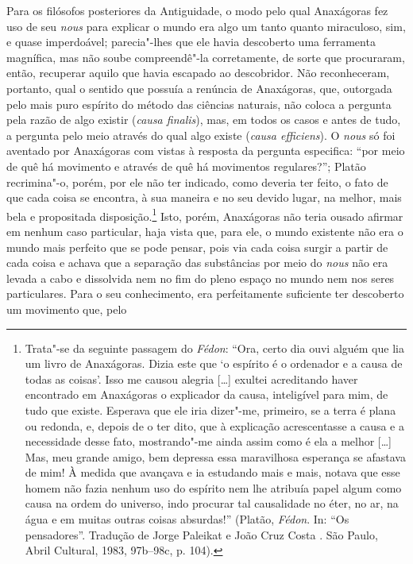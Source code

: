 Para os filósofos posteriores da Antiguidade, o modo pelo qual
Anaxágoras fez uso de seu \textit{nous} para explicar o mundo era algo
um tanto quanto miraculoso, sim, e quase imperdoável; parecia"-lhes que
ele havia descoberto uma ferramenta magnífica, mas não soube
compreendê"-la corretamente, de sorte que procuraram, então, recuperar
aquilo que havia escapado ao descobridor. Não reconheceram, portanto,
qual o sentido que possuía a renúncia de Anaxágoras, que, outorgada
pelo mais puro espírito do método das ciências naturais, não coloca a
pergunta pela razão de algo existir (\textit{causa finalis}), mas, em \label{causafinalis}
todos os casos e antes de tudo, a pergunta pelo meio através do qual
algo existe (\textit{causa efficiens}). O \textit{nous} só foi aventado
por Anaxágoras com vistas à resposta da pergunta especifica: ``por meio
de quê há movimento e através de quê há movimentos regulares?''; Platão
recrimina"-o, porém, por ele não ter indicado, como deveria ter feito, o
fato de que cada coisa se encontra, à sua maneira e no seu devido
lugar, na melhor, mais bela e propositada disposição.\footnote{ Trata"-se 
da seguinte passagem do \textit{Fédon}: ``Ora, certo dia ouvi
alguém que lia um livro de Anaxágoras. Dizia este que `o espírito é o
ordenador e a causa de todas as coisas'. Isso me causou alegria [\ldots]
exultei acreditando haver encontrado em Anaxágoras o explicador da
causa, inteligível para mim, de tudo que existe. Esperava que ele iria
dizer"-me, primeiro, se a terra é plana ou redonda, e, depois de o ter
dito, que à explicação acrescentasse a causa e a necessidade desse
fato, mostrando"-me ainda assim como é ela a melhor [\ldots] Mas, meu
grande amigo, bem depressa essa maravilhosa esperança se afastava de
mim! À medida que avançava e ia estudando mais e mais, notava que esse
homem não fazia nenhum uso do espírito nem lhe atribuía papel algum
como causa na ordem do universo, indo procurar tal causalidade no éter,
no ar, na água e em muitas outras coisas absurdas!'' (Platão,
\textit{Fédon}. In: ``Os pensadores''. Tradução de Jorge Paleikat e João
Cruz Costa . São Paulo, Abril Cultural, 1983, 97b--98c, p. 104).} 
Isto, porém, Anaxágoras não teria ousado afirmar em nenhum caso
particular, haja vista que, para ele, o mundo existente não era o mundo
mais perfeito que se pode pensar, pois via cada coisa surgir a partir
de cada coisa e achava que a separação das substâncias por meio do
\textit{nous} não era levada a cabo e dissolvida nem no fim do pleno
espaço no mundo nem nos seres particulares. Para o seu conhecimento,
era perfeitamente suficiente ter descoberto um movimento que, pelo
